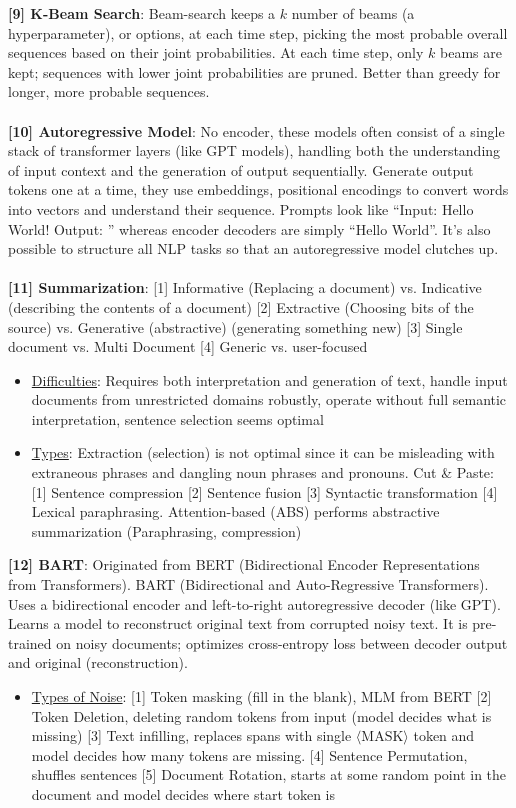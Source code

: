 \textbf{[9] K-Beam Search}: Beam-search keeps a $k$ number of beams (a hyperparameter), or options, at each time step, picking the most probable overall sequences based on their joint probabilities. At each time step, only $k$ beams are kept; sequences with lower joint probabilities are pruned. Better than greedy for longer, more probable sequences.\\
\\
\textbf{[10] Autoregressive Model}: No encoder, these models often consist of a single stack of transformer layers (like GPT models), handling both the understanding of input context and the generation of output sequentially. Generate output tokens one at a time, they use embeddings, positional encodings to convert words into vectors and understand their sequence. Prompts look like ``Input: Hello World! Output: '' whereas encoder decoders are simply ``Hello World''. It's also possible to structure all NLP tasks so that an autoregressive model clutches up. \\
\\
\textbf{[11] Summarization}: [1] Informative (Replacing a document) vs. Indicative (describing the contents of a document) [2] Extractive (Choosing bits of the source) vs. Generative (abstractive) (generating something new) [3] Single document vs. Multi Document [4] Generic vs. user-focused
\begin{itemize}
    \item \underline{Difficulties}: Requires both interpretation and generation of text, handle input documents from unrestricted domains robustly, operate without full semantic interpretation, sentence selection seems optimal
    \item \underline{Types}: Extraction (selection) is not optimal since it can be misleading with extraneous phrases and dangling noun phrases and pronouns. Cut \& Paste: [1]  Sentence compression [2] Sentence fusion [3] Syntactic transformation [4] Lexical paraphrasing. Attention-based (ABS) performs abstractive summarization (Paraphrasing, compression)
\end{itemize}
\textbf{[12] BART}: Originated from BERT (Bidirectional Encoder Representations from Transformers). BART (Bidirectional and Auto-Regressive Transformers). Uses a bidirectional encoder and left-to-right autoregressive decoder (like GPT). Learns a model to reconstruct original text from corrupted noisy text. It is pre-trained on noisy documents; optimizes cross-entropy loss between decoder output and original (reconstruction).
\begin{itemize}
    \item \underline{Types of Noise}: [1] Token masking (fill in the blank), MLM from BERT [2] Token Deletion, deleting random tokens from input (model decides what is missing) [3] Text infilling, replaces spans with single $\langle\text{MASK}\rangle$ token and model decides how many tokens are missing. [4] Sentence Permutation, shuffles sentences [5] Document Rotation, starts at some random point in the document and model decides where start token is
\end{itemize}
